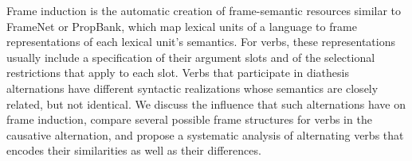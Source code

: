 Frame induction is the automatic creation of frame-semantic resources similar to FrameNet or PropBank, which map lexical units of a language to frame representations of each lexical unit's semantics. For verbs, these representations usually include a specification of their argument slots and of the selectional restrictions that apply to each slot. Verbs that participate in diathesis alternations have different syntactic realizations whose semantics are closely related, but not identical. We discuss the influence that such alternations have on frame induction, compare several possible frame structures for verbs in the causative alternation, and propose a systematic analysis of alternating verbs that encodes their similarities as well as their differences.
